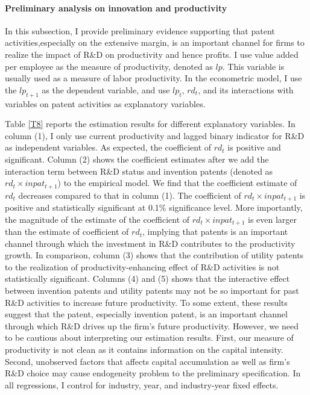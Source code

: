 \paragraph{Preliminary analysis on innovation and productivity}
In this subsection, I provide
preliminary evidence supporting that patent activities,especially on the extensive margin, is an important
channel for firms to realize the impact of R\&D on productivity and
hence profits. I use value added per employee as the measure of productivity,
denoted as $lp$. This variable is usually used
as a measure of labor productivity. In the econometric model, I use
the $lp_{t+1}$ as the dependent variable, and use $lp_{t}$, $rd_{t}$,
and its interactions with variables on patent activities as explanatory
variables. 

Table \ref{T8} reports the estimation results for different
explanatory variables. In column (1), I only use current productivity
and lagged binary indicator for R\&D as independent variables. As expected, the
coefficient of $rd_{t}$ is positive and significant. Column (2) shows the coefficient estimates
after we add the interaction term between R\&D status and invention
patents (denoted as $rd_{t}\times inpat_{t+1}$) to the empirical
model. We find that the coefficient estimate of $rd_{t}$ decreases
compared to that in column (1). The coefficient of $rd_{t}\times inpat_{t+1}$
is positive and statistically significant at 0.1\% significance level.
More importantly, the magnitude of the estimate of the coefficient
of $rd_{t}\times inpat_{t+1}$ is even larger than the estimate of
coefficient of $rd_{t}$, implying that patents is an important channel
through which the investment in R\&D contributes to the productivity
growth. In comparison, column (3) shows that the contribution of utility
patents to the realization of productivity-enhancing effect of R\&D
activities is not statistically significant. Columns (4) and (5) shows
that the interactive effect between invention patents and utility
patents may not be so important for past R\&D activities to increase
future productivity. To some extent, these results suggest that the
patent, especially invention patent, is an important channel through
which R\&D drives up the firm's future productivity. However,
we need to be cautious about interpreting our estimation results.
First, our measure of productivity is not clean as it contains information
on the capital intensity. Second, unobserved factors that affects
capital accumulation as well as firm's R\&D choice may cause endogeneity
problem to the preliminary specification. In all regressions, I control for industry, year, and industry-year fixed effects. 

